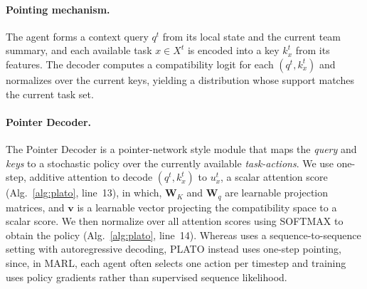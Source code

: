 \paragraph{Pointing mechanism.}
The agent forms a context query $q^t$ from its local state and the current team summary, and each available task $x\in X^t$ is encoded into a key $k_x^t$ from its features.
The decoder computes a compatibility logit for each $(q^t,k_x^t)$ and normalizes over the current keys, yielding a distribution whose support matches the current task set.




\paragraph{Pointer Decoder.}\label{actor:decoder} The Pointer Decoder is a pointer-network style \cite{ptr} module that maps the \emph{query} and \emph{keys} to a stochastic policy over the currently available \emph{task-actions}.  We use one-step, additive attention \cite{bahdanau2014neural} to decode $(q^t,k_x^t)$ to $u_x^t$, a scalar attention score (Alg.~\ref{alg:plato}, line~13), in which, \(\mathbf{W}_K\) and \(\mathbf{W}_q\) are learnable projection matrices, and
\(\mathbf{v}\) is a learnable vector projecting the compatibility space to a scalar score. We then normalize over all attention scores using  SOFTMAX to obtain the policy (Alg.~\ref{alg:plato}, line~14).  Whereas \cite{ptr} uses a sequence-to-sequence setting with autoregressive decoding, PLATO instead uses one-step pointing, since, in MARL, each agent often selects one action per timestep and training uses policy gradients rather than supervised sequence likelihood. 





